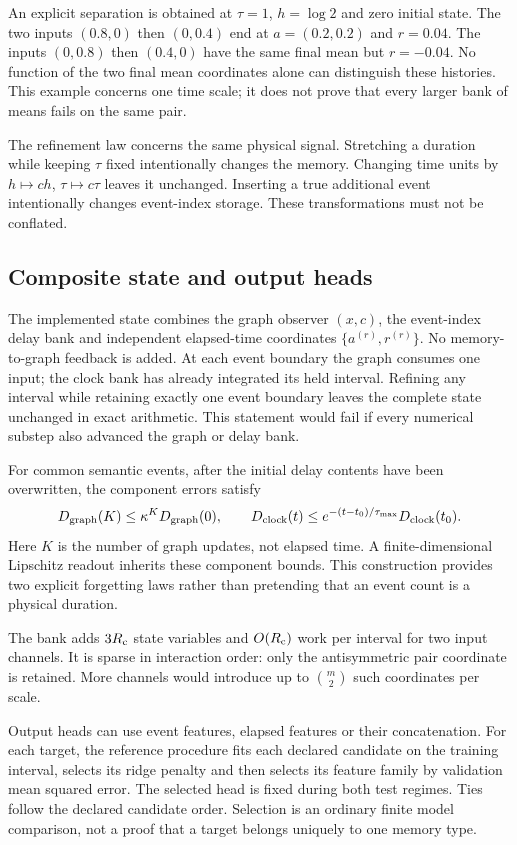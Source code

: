 \documentclass[11pt,a4paper]{article}
\theoremstyle{definition}\newtheorem{definition}[theorem]{Definition}
\begin{document}
An explicit separation is obtained at $\tau=1$, $h=\log2$ and zero initial state. The two inputs $(0.8,0)$ then $(0,0.4)$ end at $a=(0.2,0.2)$ and $r=0.04$. The inputs $(0,0.8)$ then $(0.4,0)$ have the same final mean but $r=-0.04$. No function of the two final mean coordinates alone can distinguish these histories. This example concerns one time scale; it does not prove that every larger bank of means fails on the same pair.

The refinement law concerns the same physical signal. Stretching a duration while keeping $\tau$ fixed intentionally changes the memory. Changing time units by $h\mapsto ch$, $\tau\mapsto c\tau$ leaves it unchanged. Inserting a true additional event intentionally changes event-index storage. These transformations must not be conflated.

\subsection{Composite state and output heads}
The implemented state combines the graph observer $(x,c)$, the event-index delay bank and independent elapsed-time coordinates $\{a^{(r)},r^{(r)}\}$. No memory-to-graph feedback is added. At each event boundary the graph consumes one input; the clock bank has already integrated its held interval. Refining any interval while retaining exactly one event boundary leaves the complete state unchanged in exact arithmetic. This statement would fail if every numerical substep also advanced the graph or delay bank.

For common semantic events, after the initial delay contents have been overwritten, the component errors satisfy
\begin{equation}
 D_{\rm graph}(K)\leq\kappa^K D_{\rm graph}(0),\qquad
 D_{\rm clock}(t)\leq e^{-(t-t_0)/\tau_{\max}}D_{\rm clock}(t_0).\label{eq:twoclocks}
\end{equation}
Here $K$ is the number of graph updates, not elapsed time. A finite-dimensional Lipschitz readout inherits these component bounds. This construction provides two explicit forgetting laws rather than pretending that an event count is a physical duration.

The bank adds $3R_{\rm c}$ state variables and $O(R_{\rm c})$ work per interval for two input channels. It is sparse in interaction order: only the antisymmetric pair coordinate is retained. More channels would introduce up to $\binom m2$ such coordinates per scale.

Output heads can use event features, elapsed features or their concatenation. For each target, the reference procedure fits each declared candidate on the training interval, selects its ridge penalty and then selects its feature family by validation mean squared error. The selected head is fixed during both test regimes. Ties follow the declared candidate order. Selection is an ordinary finite model comparison, not a proof that a target belongs uniquely to one memory type.
\end{document}
